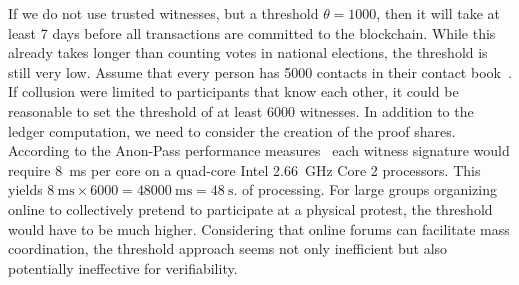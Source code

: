 If we do not use trusted witnesses, but a threshold \(\theta = 1000\), then it will take at least 7 days before all transactions are committed to the blockchain. While this already takes longer than counting votes in national elections, the threshold is still very low. Assume that every person has 5000 contacts in their contact book~\cite{DifficultyOfPrivateContactDiscovery}.
If collusion were limited to participants that know each other, it could be reasonable to set the threshold of at least 6000 witnesses. In addition to the ledger computation, we need to consider the creation of the proof shares. 
According to the Anon-Pass performance measures~\cite{AnonPass} each witness signature would require \SI{8}{\milli\second} per core on a quad-core Intel \SI{2.66}{\giga\hertz} Core 2 processors.
This yields \(
  \SI{8}{\milli\second}\times 6000 = \SI{48000}{\milli\second} = 
  \SI{48}{\second}.
\) of processing. For large groups organizing online to collectively pretend to participate at a physical protest, the threshold would have to be much higher. Considering that online forums can facilitate mass coordination, the threshold approach seems not only inefficient but also potentially ineffective for verifiability.




